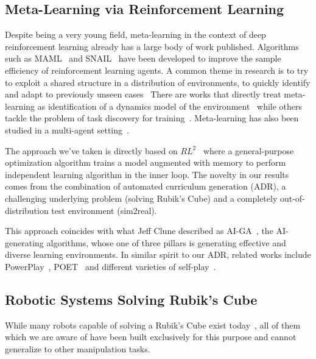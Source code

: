 \subsection{Meta-Learning via Reinforcement Learning}

Despite being a very young field, meta-learning in the context of deep reinforcement learning already has a large body of work published. Algorithms such as MAML~\cite{DBLP:journals/corr/FinnAL17} and SNAIL~\cite{DBLP:journals/corr/MishraRCA17} have been developed to improve the sample efficiency of reinforcement learning agents. A common theme in research is to try to exploit a shared structure in a distribution of environments, to quickly identify and adapt to previously unseen cases~\cite{DBLP:journals/corr/abs-1907-04964, Smundsson2018MetaRL,DBLP:journals/corr/abs-1905-06424,Lan2019MetaRL}
There are works that directly treat meta-learning as identification of a dynamics model of the environment~\cite{DBLP:journals/corr/abs-1803-11347} while others tackle the problem of task discovery for training~\cite{DBLP:journals/corr/abs-1806-04640}.
Meta-learning has also been studied in a multi-agent setting~\cite{DBLP:journals/corr/abs-1903-02710}.

The approach we've taken is directly based on $RL^2$~\cite{DBLP:journals/corr/DuanSCBSA16,DBLP:journals/corr/WangKTSLMBKB16} where a general-purpose optimization algorithm trains a model augmented with memory to perform independent learning algorithm in the inner loop. The novelty in our results comes from the combination of automated curriculum generation (ADR), a challenging underlying problem (solving Rubik's Cube) and a completely out-of-distribution test environment (sim2real). 

This approach coincides with what Jeff Clune described as AI-GA~\cite{clune2019ai}, the AI-generating algorithms, whose one of three pillars is generating effective and diverse learning environments. In similar spirit to our ADR, related works include  PowerPlay~\cite{DBLP:journals/corr/abs-1112-5309,DBLP:journals/corr/abs-1210-8385}, POET~\cite{wang2019poet} and different varieties of self-play~\cite{alphago,DBLP:journals/corr/abs-1712-01815,five}.


\subsection{Robotic Systems Solving Rubik's Cube}

While many robots capable of solving a Rubik's Cube exist today~\cite{rubikguinnes,mindcuber,rcr3d,higo2018rubik}, all of them which we are aware of have been built exclusively for this purpose and cannot generalize to other manipulation tasks.






